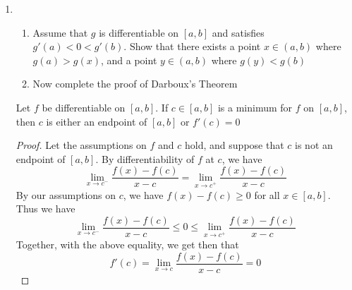 \begin{enumerate}
\begin{enumerate}
        \item \( g_{a} \) is differentiable on \( \mathbb{R} \) with \( g_{a}' \) continuous but not differentiable at zero.
        
        \item \( g_{a} \) is differentiable on \( \mathbb{R} \) and \( g_{a}' \) is differentiable on \( \mathbb{R} \), but such that \( g_{a}'' \) is not continuous at zero. 
    \end{enumerate}
    
    \begin{proof}
    \begin{enumerate}
        \item 
    \end{enumerate}
    \end{proof}
    
    \item
    \begin{enumerate}
        \item Assume that \( g \) is differentiable on \( [a,b] \) and satisfies \( g'(a) < 0 < g'(b) \). Show that there exists a point \( x \in (a,b) \) where \( g(a) > g(x) \), and a point \( y \in (a,b) \) where \( g(y) < g(b) \)
        
        \item Now complete the proof of Darboux's Theorem
    \end{enumerate}
    
    \begin{lemma}
    Let \( f \) be differentiable on \( [a,b] \). If \( c \in [a,b] \) is a minimum for \( f \) on \( [a,b] \), then \( c \) is either an endpoint of \( [a,b] \) or \( f'(c) = 0 \)
    \end{lemma}
    
    \begin{proof}
    Let the assumptions on \( f \) and \( c \) hold, and suppose that \( c \) is not an endpoint of \( [a,b] \). By differentiability of \( f \) at \( c \), we have
    \[
    \lim_{x \rightarrow c^-} \frac{f(x)-f(c)}{x-c} = \lim_{x \rightarrow c^+} \frac{f(x)-f(c)}{x-c}
    \]
    By our assumptions on \(c\), we have \( f(x) -f(c) \geq 0 \) for all \( x \in [a,b] \). Thus we have
    \[
    \lim_{x \rightarrow c^-} \frac{f(x)-f(c)}{x-c} \leq 0 \leq \lim_{x \rightarrow c^+} \frac{f(x)-f(c)}{x-c}    
    \]
    Together, with the above equality, we get then that
    \[
    f'(c) = \lim_{x \rightarrow c} \frac{f(x)-f(c)}{x-c} = 0
    \]
    \end{proof}
    

\end{enumerate}
